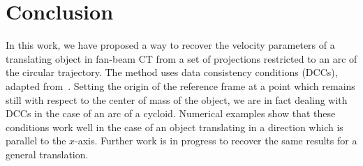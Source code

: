 \documentclass[twocolumn]{IEEEtran}
\begin{document}
\section{Conclusion}
In this work, we have proposed a way to recover the velocity parameters of a translating object in fan-beam CT from a set of projections restricted to an arc of the circular trajectory. The method uses data consistency conditions (DCCs), adapted from~\cite{clackdoyle2015consistency}. Setting the origin of the reference frame at a point which remains still with respect to the center of mass of the object, we are in fact dealing with DCCs in the case of an arc of a cycloid. Numerical examples show that these conditions work well in the case of an object translating in a direction which is parallel to the $x$-axis. Further work is in progress to recover the same results for a general translation.




\end{document}
